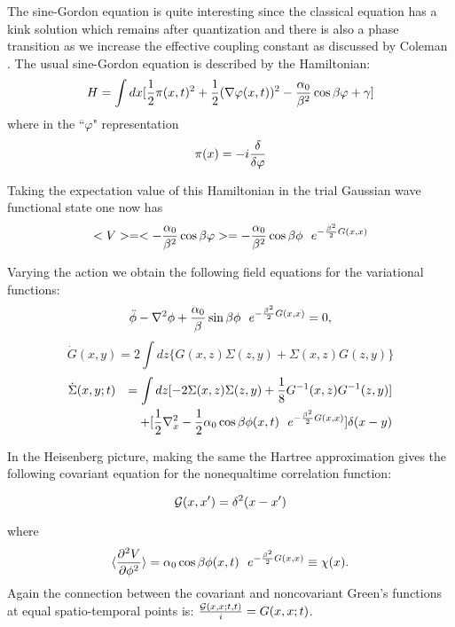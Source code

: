 \documentclass[a4paper,prd,preprint,superscriptaddress,showpacs,byrevtex]{revtex4}
\begin{document}
The sine-Gordon equation is quite interesting since the classical
equation has a kink solution which remains after quantization and  there is
also
a phase transition as we increase the effective coupling constant as
discussed
by Coleman \cite{ref:Coleman}.  The  usual sine-Gordon equation is described
by
the Hamiltonian: \begin{equation}
H= \int dx [ {1 \over 2} \pi(x,t)^2 + {1\over 2} (\nabla \varphi(x,t))^2
- {\alpha_0 \over \beta^2} \cos \beta \varphi + \gamma ]
\end{equation}
where in the ``$\varphi$" representation
\[
\pi(x) = -i {\delta \over \delta \varphi}
\]

Taking the expectation value of this Hamiltonian in the trial
Gaussian wave functional state one now has
\begin{equation}
< V > = < - {\alpha_0 \over \beta^2} \cos \beta \varphi > =
  - {\alpha_0 \over \beta^2} \cos \beta \phi~~ e^{- {\beta^2 \over 2}
G(x,x)}
\end{equation}

Varying the action we obtain the following field equations for the
variational functions:
\begin{equation}
\ddot{\phi} - \nabla^2 \phi + {\alpha_0 \over \beta} \sin \beta \phi
~~e^{- {\beta^2 \over 2} G(x,x)} =0 \label{eq:phi},
\end{equation}
\begin{equation}
\dot{G}(x,y) =  2 \int dz  \{G(x,z) \Sigma(z,y) + \Sigma (x,z) G(z,y) \}
\label{eq:g}
\end{equation}
\begin{eqnarray}
\dot{\Sigma}(x,y;t)&&=  \int dz[-2 \Sigma (x,z)\Sigma (z,y) + {1 \over 8}
G^{-1}
(x,z)G^{-1} (z,y) ]  \nonumber \\
&& +  [{1 \over 2}\nabla^{2}_{x}
-{1\over 2} \alpha_0 \cos \beta \phi(x,t)
~~e^{- {\beta^2 \over 2} G(x,x)}] \delta (x-y)
\label{eq:sig2}
\end{eqnarray}

In the Heisenberg picture, making the same the Hartree approximation gives
the
following  covariant equation for the nonequaltime correlation function:

\begin{equation}
[\Box + \langle \frac{\partial^2 V}{\partial \phi^2} \rangle ]{\cal G}
(x,x') = \delta^2(x-x')
\end{equation}

where
\begin{equation}
\langle \frac{\partial^2 V}{\partial \phi^2} \rangle = \alpha_0 \cos \beta
\phi(x,t)
~~e^{- {\beta^2 \over 2} G(x,x)} \equiv \chi(x).
\end{equation}
Again the connection between the covariant and noncovariant Green's
functions
at equal spatio-temporal points is: $ \frac {{\cal G}(x,x; t,t)}{i} =
G(x,x;t)$.
\end{document}
